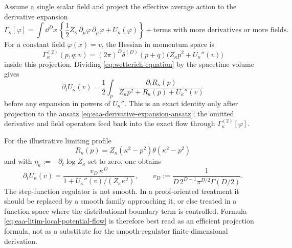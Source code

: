 \begin{example}
\label{ex:eaa-local-potential-flow}
Assume a single scalar field and project the effective average action to the
derivative expansion
\begin{equation}
  \Gamma_\kappa[\varphi]
  =
  \int\dd^Dx\,
  \left\{
    \frac12 Z_\kappa\,\partial_\mu\varphi\,\partial_\mu\varphi
    +U_\kappa(\varphi)
  \right\}
  +\text{terms with more derivatives or more fields}.
  \label{eq:eaa-derivative-expansion-ansatz}
\end{equation}
For a constant field \(\varphi(x)=v\), the Hessian in momentum space is
\[
  \Gamma_\kappa^{(2)}(p,q;v)
  =
  (2\pi)^D\delta^{(D)}(p+q)
  \bigl(Z_\kappa p^2+U_\kappa''(v)\bigr)
\]
inside this projection.  Dividing \eqref{eq:wetterich-equation} by the
spacetime volume gives
\begin{equation}
  \partial_t U_\kappa(v)
  =
  \frac12\int_p
  \frac{\partial_t R_\kappa(p)}
       {Z_\kappa p^2+R_\kappa(p)+U_\kappa''(v)}
  \label{eq:eaa-local-potential-flow}
\end{equation}
before any expansion in powers of \(U_\kappa''\).  This is an exact identity
only after projection to the ansatz
\eqref{eq:eaa-derivative-expansion-ansatz}; the omitted derivative and field
operators feed back into the exact flow through
\(\Gamma_\kappa^{(2)}[\varphi]\).

For the illustrative limiting profile
\[
  R_\kappa(p)=Z_\kappa(\kappa^2-p^2)\theta(\kappa^2-p^2)
\]
and with \(\eta_\kappa:=-\partial_t\log Z_\kappa\) set to zero, one obtains
\begin{equation}
  \partial_t U_\kappa(v)
  =
  \frac{v_D\,\kappa^D}
       {1+U_\kappa''(v)/(Z_\kappa\kappa^2)},
  \qquad
  v_D:=
  \frac{1}{D\,2^{D-1}\pi^{D/2}\Gamma(D/2)} .
  \label{eq:eaa-litim-local-potential-flow}
\end{equation}
The step-function regulator is not smooth.  In a proof-oriented treatment it
should be replaced by a smooth family approaching it, or else treated in a
function space where the distributional boundary term is controlled.  Formula
\eqref{eq:eaa-litim-local-potential-flow} is therefore best read as an
efficient projection formula, not as a substitute for the smooth-regulator
finite-dimensional derivation.
\end{example}

